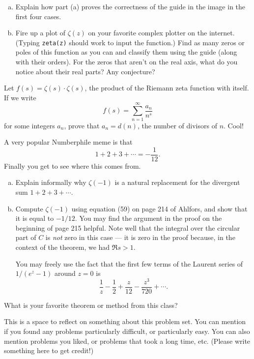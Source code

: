 \begin{problem}
\begin{enumerate}[(a)]
  \item Explain how part (a) proves the correctness of the guide in the image in the first four cases.
  
  \item Fire up a plot of $\zeta(z)$ on your favorite complex plotter on the internet. (Typing \texttt{zeta(z)} should work to input the function.) Find as many zeros or poles of this function as you can and classify them using the guide (along with their orders). For the zeros that aren't on the real axis, what do you notice about their real parts? Any conjecture?
\end{enumerate}
\end{problem}

\begin{problem}
  Let $f(s)=\zeta(s)\cdot\zeta(s)$, the product of the Riemann zeta function with itself. If we write
  \[f(s)=\sum_{n=1}^\infty\frac{a_n}{n^s}\]
  for some integers $a_n$, prove that $a_n=d(n)$, the number of divisors of $n$. Cool!
\end{problem}

\begin{problem}
  A very popular Numberphile meme is that
  \[1+2+3+\cdots=-\frac 1{12}.\]
  Finally you get to see where this comes from.
  \begin{enumerate}[(a)]
    \item Explain informally why $\zeta(-1)$ is a natural replacement for the divergent sum $1+2+3+\cdots$.
    \item Compute $\zeta(-1)$ using equation (59) on page 214 of Ahlfors, and show that it is equal to $-1/12$. You may find the argument in the proof on the beginning of page 215 helpful. Note well that the integral over the circular part of $C$ is \emph{not} zero in this case --- it is zero in the proof because, in the context of the theorem, we had $\Re s>1$.
    
    You may freely use the fact that the first few terms of the Laurent series of $1/(e^z-1)$ around $z=0$ is
    \[\frac 1z-\frac12+\frac z{12}-\frac{z^3}{720}+\cdots.\]
  \end{enumerate}
\end{problem}

\begin{problem}
  What is your favorite theorem or method from this class?
\end{problem}

\begin{problem}
This is a space to reflect on something about this problem set. You can mention if you found any problems particularly difficult, or particularly easy. You can also mention problems you liked, or problems that took a long time, etc. (Please write something here to get credit!)
\end{problem}
